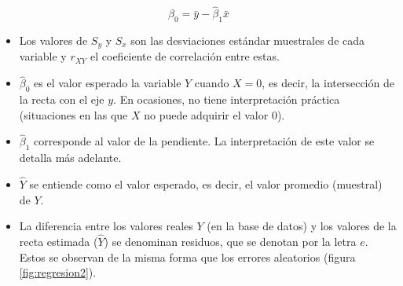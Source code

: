 \documentclass[
  11pt,
]{book}
\providecommand{\tightlist}{%
  \setlength{\itemsep}{0pt}\setlength{\parskip}{0pt}}
\theoremstyle{definition}
\theoremstyle{definition}
\theoremstyle{definition}
\theoremstyle{definition}
\theoremstyle{remark}
\begin{document}
\begin{equation}
\widehat{\beta}_0 = \bar{y} - \widehat{\beta}_1\bar{x}
\label{eq:beta0gorro}
\end{equation}

\begin{itemize}
\tightlist
\item
  Los valores de \(S_y\) y \(S_x\) son las desviaciones estándar muestrales de cada variable y \(r_{XY}\) el coeficiente de correlación entre estas.
\item
  \(\widehat{\beta}_0\) es el valor esperado la variable \(Y\) cuando \(X = 0\), es decir, la intersección de la recta con el eje \(y\). En ocasiones, no tiene interpretación práctica (situaciones en las que \(X\) no puede adquirir el valor 0).
\item
  \(\widehat{\beta}_1\) corresponde al valor de la pendiente. La interpretación de este valor se detalla más adelante.
\item
  \(\widehat{Y}\) se entiende como el valor esperado, es decir, el valor promedio (muestral) de \(Y\).
\item
  La diferencia entre los valores reales \(Y\) (en la base de datos) y los valores de la recta estimada (\(\widehat{Y}\)) se denominan residuos, que se denotan por la letra \(e\). Estos se observan de la misma forma que los errores aleatorios (figura \ref{fig:regresion2}).
\end{itemize}
\end{document}
